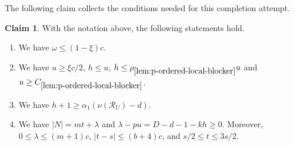 \documentclass[10pt,a4paper]{article}
\numberwithin{equation}{section}
\theoremstyle{definition}
\newtheorem{claim}[claim]{Claim}
\newcommand{\Rcal}{\mathcal R}
\begin{document}
The following claim collects the conditions needed for this completion
attempt.
\begin{claim}\label{cl:completion-bookkeeping}
        With the notation above, the following statements hold.
        \begin{enumerate}[label=\textup{(\roman*)},leftmargin=2.2em]
                \item
                      We have $\omega\le(1-\xi)c$.

                \item
                      We have $u\ge \xi c/2$, $h\le u$,
                      $h\le
                              \rho_{\ref{lem:p-ordered-local-blocker}}u$ and
                      $u\ge C_{\ref{lem:p-ordered-local-blocker}}$.

                \item
                      We have
                      $h+1\ge\alpha_1(\nu(\Rcal_U)-d)$.

                \item
                      We have $|N|=mt+\lambda$ and
                      $\lambda-pu=D-d-1-kh\ge0$.
                      Moreover, $0\le\lambda\le(m+1)c$,
                      $|t-s|\le(b+4)c$, and
                      $s/2\le t\le3s/2$.
        \end{enumerate}
\end{claim}
\end{document}
